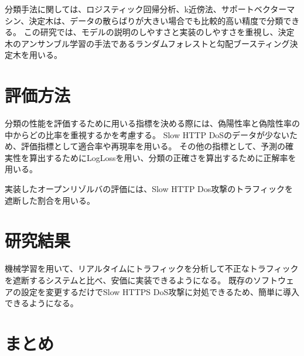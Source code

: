 \documentclass[twocolumn,article]{jlreq}
\begin{document}
分類手法に関しては、ロジスティック回帰分析、k近傍法、サポートベクターマシン、決定木は、データの散らばりが大きい場合でも比較的高い精度で分類できる。%
この研究では、モデルの説明のしやすさと実装のしやすさを重視し、決定木のアンサンブル学習の手法であるランダムフォレストと勾配ブースティング決定木を用いる。

\section{評価方法}
分類の性能を評価するために用いる指標を決める際には、偽陽性率と偽陰性率の中からどの比率を重視するかを考慮する。%
Slow HTTP DoSのデータが少ないため、評価指標として適合率や再現率を用いる。%
その他の指標として、予測の確実性を算出するためにLogLossを用い、分類の正確さを算出するために正解率を用いる。%

実装したオープンリゾルバの評価には、Slow HTTP Dos攻撃のトラフィックを遮断した割合を用いる。

\section{研究結果}
機械学習を用いて、リアルタイムにトラフィックを分析して不正なトラフィックを遮断するシステムと比べ、安価に実装できるようになる。
既存のソフトウェアの設定を変更するだけでSlow HTTPS DoS攻撃に対処できるため、簡単に導入できるようになる。

\section{まとめ}

\printbibliography[title=参考文献]
\end{document}
